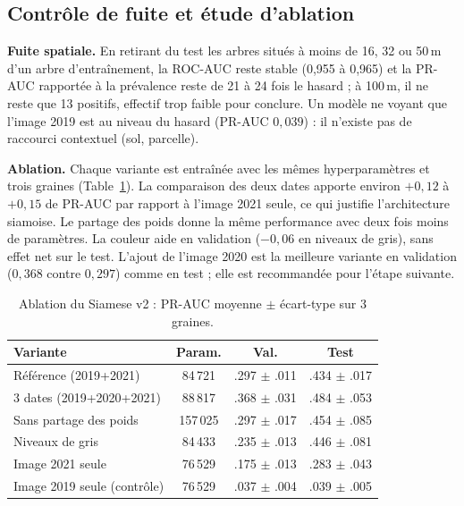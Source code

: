\subsection{Contrôle de fuite et étude d'ablation}
\textbf{Fuite spatiale.} En retirant du test les arbres situés à moins
de 16, 32 ou 50\,m d'un arbre d'entraînement, la ROC-AUC reste stable
(0,955 à 0,965) et la PR-AUC rapportée à la prévalence reste de 21 à 24
fois le hasard ; à 100\,m, il ne reste que 13 positifs, effectif trop
faible pour conclure.
Un modèle ne voyant que l'image 2019 est au niveau du hasard (PR-AUC
$0{,}039$) : il n'existe pas de raccourci contextuel (sol, parcelle).

\textbf{Ablation.} Chaque variante est entraînée avec les mêmes
hyperparamètres et trois graines (Table~\ref{tab:ablation}). La
comparaison des deux dates apporte environ $+0{,}12$ à $+0{,}15$ de
PR-AUC par rapport à l'image 2021 seule, ce qui justifie l'architecture
siamoise. Le partage des poids donne la même performance avec deux fois
moins de paramètres. La couleur aide en validation ($-0{,}06$ en
niveaux de gris), sans effet net sur le test. L'ajout de l'image 2020
est la meilleure variante en validation ($0{,}368$ contre $0{,}297$)
comme en test ; elle est recommandée pour l'étape suivante.

\begin{table}[t]
\centering
\caption{Ablation du Siamese v2 : PR-AUC moyenne $\pm$ écart-type sur 3 graines.}
\label{tab:ablation}
\small
\begin{tabular}{lccc}
\toprule
Variante & Param. & Val. & Test \\
\midrule
Référence (2019+2021)       & 84\,721  & .297 $\pm$ .011 & .434 $\pm$ .017 \\
3 dates (2019+2020+2021)    & 88\,817  & .368 $\pm$ .031 & .484 $\pm$ .053 \\
Sans partage des poids      & 157\,025 & .297 $\pm$ .017 & .454 $\pm$ .085 \\
Niveaux de gris             & 84\,433  & .235 $\pm$ .013 & .446 $\pm$ .081 \\
Image 2021 seule            & 76\,529  & .175 $\pm$ .013 & .283 $\pm$ .043 \\
Image 2019 seule (contrôle) & 76\,529  & .037 $\pm$ .004 & .039 $\pm$ .005 \\
\bottomrule
\end{tabular}
\end{table}

